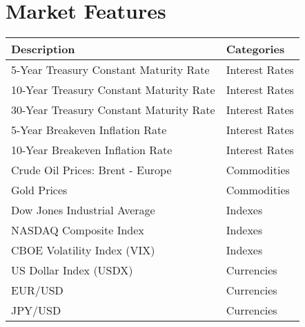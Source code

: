 \chapter{Market Features}
\label{appendix:features_list}
\par
\begin{longtable}{|| m{10cm}| m{3.5cm}||}
\hline
Description & Categories \\ \hline \hline
5-Year Treasury Constant Maturity Rate & Interest Rates\\ \hline
10-Year Treasury Constant Maturity Rate & Interest Rates\\ \hline
30-Year Treasury Constant Maturity Rate & Interest Rates\\ \hline
5-Year Breakeven Inflation Rate & Interest Rates\\ \hline
10-Year Breakeven Inflation Rate & Interest Rates\\ \hline
Crude Oil Prices: Brent - Europe &  Commodities\\ \hline
Gold Prices &  Commodities\\ \hline
Dow Jones Industrial Average &  Indexes\\ \hline
NASDAQ Composite Index &  Indexes\\ \hline
CBOE Volatility Index (VIX) &  Indexes\\ \hline
US Dollar Index (USDX) &  Currencies\\ \hline
EUR/USD &  Currencies\\ \hline
JPY/USD &  Currencies\\ \hline

\end{longtable}